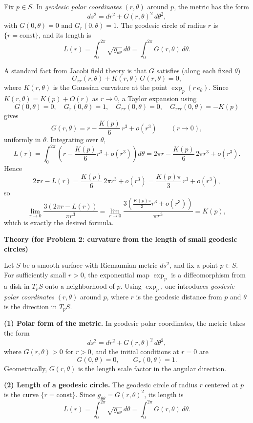 \begin{solution}
Fix \(p\in S\). In \emph{geodesic polar coordinates} \((r,\theta)\) around \(p\), the metric has the form
\[
ds^{2}=dr^{2}+G(r,\theta)^{2}\,d\theta^{2},
\]
with \(G(0,\theta)=0\) and \(G_{r}(0,\theta)=1\). The geodesic circle of radius \(r\) is \(\{r=\text{const}\}\), and its length is
\[
L(r)=\int_{0}^{2\pi} \sqrt{g_{\theta\theta}}\,d\theta=\int_{0}^{2\pi} G(r,\theta)\,d\theta.
\]

A standard fact from Jacobi field theory is that \(G\) satisfies (along each fixed \(\theta\))
\[
G_{rr}(r,\theta)+K(r,\theta)\,G(r,\theta)=0,
\]
where \(K(r,\theta)\) is the Gaussian curvature at the point \(\exp_p(r\,e_\theta)\).
Since \(K(r,\theta)=K(p)+O(r)\) as \(r\to 0\), a Taylor expansion using
\[
G(0,\theta)=0,\quad G_r(0,\theta)=1,\quad G_{rr}(0,\theta)=0,\quad
G_{rrr}(0,\theta)=-K(p)
\]
gives
\[
G(r,\theta)=r-\frac{K(p)}{6}\,r^{3}+o(r^{3})\qquad (r\to 0),
\]
uniformly in \(\theta\). Integrating over \(\theta\),
\[
L(r)=\int_{0}^{2\pi}\left(r-\frac{K(p)}{6}r^{3}+o(r^{3})\right)d\theta
=2\pi r-\frac{K(p)}{6}\,2\pi r^{3}+o(r^{3}).
\]
Hence
\[
2\pi r-L(r)=\frac{K(p)}{6}\,2\pi r^{3}+o(r^{3})=\frac{K(p)\pi}{3}\,r^{3}+o(r^{3}),
\]
so
\[
\lim_{r\to 0}\frac{3(2\pi r-L(r))}{\pi r^{3}}
=\lim_{r\to 0}\frac{3\left(\frac{K(p)\pi}{3}r^{3}+o(r^{3})\right)}{\pi r^{3}}
=K(p),
\]
which is exactly the desired formula.


\par\medskip\noindent\textbf{Theory (for Problem 2: curvature from the length of small geodesic circles)}\par\smallskip


Let \(S\) be a smooth surface with Riemannian metric \(ds^{2}\), and fix a point \(p\in S\).
For sufficiently small \(r>0\), the exponential map \(\exp_{p}\) is a diffeomorphism from a
disk in \(T_{p}S\) onto a neighborhood of \(p\). Using \(\exp_{p}\), one introduces
\emph{geodesic polar coordinates} \((r,\theta)\) around \(p\), where \(r\) is the geodesic
distance from \(p\) and \(\theta\) is the direction in \(T_{p}S\).

\medskip
\noindent\textbf{(1) Polar form of the metric.}
In geodesic polar coordinates, the metric takes the form
\[
ds^{2}=dr^{2}+G(r,\theta)^{2}\,d\theta^{2},
\]
where \(G(r,\theta)>0\) for \(r>0\), and the initial conditions at \(r=0\) are
\[
G(0,\theta)=0,\qquad G_{r}(0,\theta)=1.
\]
Geometrically, \(G(r,\theta)\) is the length scale factor in the angular direction.

\medskip
\noindent\textbf{(2) Length of a geodesic circle.}
The geodesic circle of radius \(r\) centered at \(p\) is the curve \(\{r=\text{const}\}\).
Since \(g_{\theta\theta}=G(r,\theta)^{2}\), its length is
\[
L(r)=\int_{0}^{2\pi}\sqrt{g_{\theta\theta}}\,d\theta=\int_{0}^{2\pi}G(r,\theta)\,d\theta.
\]


\end{solution}
